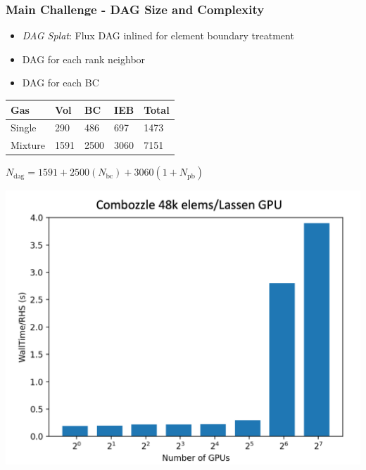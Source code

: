 \begin{frame}\frametitle{Main Challenge - DAG Size and Complexity}
\vspace{10pt}
\begin{minipage}[t][0.4\textheight][t]{\textwidth}
\begin{multicols}{2}
\begin{itemize}
\item \textit{DAG Splat}: Flux DAG inlined for element boundary treatment
\item DAG for each rank neighbor
\item DAG for each BC
\end{itemize}
\columnbreak
\begin{table}
\centering
\begin{tabularx}{\linewidth}{|X|X|X|X|X|}
\hline
\textbf{Gas} & \textbf{Vol} & \textbf{BC} & \textbf{IEB} & \textbf{Total} \\ \hline
Single & 290 & 486 & 697 & 1473 \\ \hline
Mixture & 1591 & 2500 & 3060 & 7151 \\ \hline
\end{tabularx}
$N_{\text{dag}} = 1591 + 2500(N_{\text{bc}}) + 3060(1 + N_{\text{pb}})$
\end{table}
\end{multicols}
\end{minipage}\vfill
\vspace{-20pt}
\begin{minipage}[t][0.4\textheight][t]{\textwidth}
\centering
\includegraphics[width=.4\textwidth]{Figures/mtc/combozzle_weak_bad_partitioning.png}\hspace{30pt}

\end{minipage}
\end{frame}
